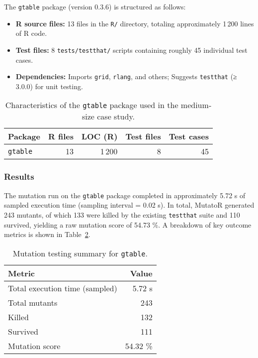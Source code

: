 The \texttt{gtable} package (version 0.3.6) is structured as follows:

\begin{itemize}
  \item \textbf{R source files:} 13 files in the \texttt{R/} directory, totaling approximately 1\,200 lines of R code.
  \item \textbf{Test files:} 8 \texttt{tests/testthat/} scripts containing roughly 45 individual test cases.
  \item \textbf{Dependencies:} Imports \texttt{grid}, \texttt{rlang}, and others; Suggests \texttt{testthat} (≥ 3.0.0) for unit testing.
\end{itemize}

\begin{table}[htbp]
  \centering
  \begin{tabular}{lrrrr}
    \toprule
    Package  & R files & LOC (R) & Test files & Test cases \\
    \midrule
    \texttt{gtable} & 13      & 1\,200    & 8          & 45         \\
    \bottomrule
  \end{tabular}
  \caption{Characteristics of the \texttt{gtable} package used in the medium‐size case study.}
  \label{tab:gtable-metrics}
\end{table}

\subsubsection{Results}

The mutation run on the \texttt{gtable} package completed in approximately 5.72 s of sampled execution time (sampling interval = 0.02 s).  In total, MutatoR generated 243 mutants, of which 133 were killed by the existing \texttt{testthat} suite and 110 survived, yielding a raw mutation score of 54.73 \%.  A breakdown of key outcome metrics is shown in Table~\ref{tab:gtable-summary}.

\begin{table}[htbp]
  \centering
  \begin{tabular}{lr}
    \toprule
    Metric               & Value    \\
    \midrule
    Total execution time (sampled) & 5.72 s   \\
    Total mutants        & 243      \\
    Killed               & 132      \\
    Survived             & 111      \\
    Mutation score       & 54.32 \% \\
    \bottomrule
  \end{tabular}
  \caption{Mutation testing summary for \texttt{gtable}.}
  \label{tab:gtable-summary}
\end{table}


